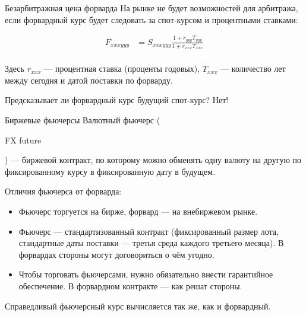 \documentclass{beamer}
\newcommand{\en}[1]{\begin{otherlanguage}{english}#1\end{otherlanguage}}
\begin{document}
\begin{frame}{Безарбитражная цена форварда}
\justify
На рынке не будет возможностей для арбитража, если форвардный курс будет следовать за спот-курсом и процентными ставками:

\begin{align*}
F_{xxxyyy} &= S_{xxxyyy} \frac{1 + r_{yyy}T_{yyy}}{1 + r_{xxx}T_{xxx}} \\
\end{align*}

Здесь $r_{xxx}$ --- процентная ставка (проценты годовых), $T_{xxx}$ --- количество лет между сегодня и датой поставки по форварду.

\justify
Предсказывает ли форвардный курс будущий спот-курс? Нет!
\end{frame}



\begin{frame}{Биржевые фьючерсы}
\justify
\alert{Валютный фьючерс} (\en{FX future}) --- биржевой контракт, по которому можно обменять одну валюту на другую по фиксированному курсу в фиксированную дату в будущем.

\justify
Отличия фьючерса от форварда:
\begin{itemize}
\justifying
\item Фьючерс торгуется на бирже, форвард --- на внебиржевом рынке.
\item Фьючерс --- стандартизованный контракт (фиксированный размер лота, стандартные даты поставки --- третья среда каждого третьего месяца). В форвардах стороны могут договориться о чём угодно.
\item Чтобы торговать фьючерсами, нужно обязательно внести гарантийное обеспечение. В форвардном контракте --- как решат стороны.
\end{itemize}

\justify
Справедливый фьючерсный курс вычисляется так же, как и форвардный.
\end{frame}
\end{document}
